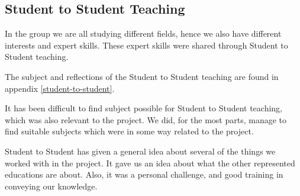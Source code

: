 \subsection{Student to Student Teaching}
In the group we are all studying different fields, hence we also have different interests and expert skills. 
These expert skills were shared through Student to Student teaching. 

The subject and reflections of the Student to Student teaching are found in appendix \ref{student-to-student}.

It has been difficult to find subject possible for Student to Student teaching, which was also relevant to the project. We did, for the most parts, manage to find suitable subjects which were in some way related to the project. 

Student to Student has given a general idea about several of the things we worked with in the project. It gave us an idea about what the other represented educations are about. Also, it was a personal challenge, and good training in conveying our knowledge. 

